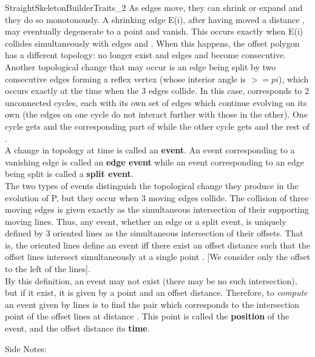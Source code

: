 \begin{ccRefConcept}{StraightSkeletonBuilderTraits_2}
As edges move, they can shrink or expand and they do so monotonously. A shrinking edge E(i), after having moved a distance , may eventually degenerate to a point and vanish. This occurs exactly when E(i) collides simultaneously with edges  and . When this happens, the offset polygon  has a different topology:  no longer exist and edges  and  become consecutive. Another topological change that may occur is an edge  being split by two consecutive edges  forming a reflex vertex (whose interior angle is $>=pi$), which occurs exactly at the time  when the 3 edges collide. In this case,  corresponds to 2 unconnected cycles, each with its own set of edges which continue evolving on its own (the edges on one cycle do not interact further with those in the other). One cycle gets  and the corresponding part of  while the other cycle gets  and the rest of .\\
A change in topology at time  is called an \textbf{event}. An event corresponding to a vanishing edge is called an \textbf{edge event} while an event corresponding to an edge being split is called a \textbf{split event}.\\
The two types of events distinguish the topological change they produce in the evolution of P, but they occur when 3 moving edges collide. The collision of three moving edges is given exactly as the simultaneous intersection of their supporting moving lines. Thus, any event, whether an edge or a split event, is uniquely defined by 3 oriented lines as the simultaneous intersection of their offsets. That is, the oriented lines  define an event iff there exist an offset distance  such that the offset lines  intersect simultaneously at a single point . [We consider only the offset to the left of the lines].\\
By this definition, an event may not exist (there may be no such intersection), but if it exist, it is given by a point and an offset distance. Therefore, to \textit{compute} an event given by lines  is to find the pair  which corresponds to the intersection point  of the offset lines at distance . This point is called the \textbf {position} of the event, and the offset distance its \textbf{time}.


Side Notes:


\end{ccRefConcept}
